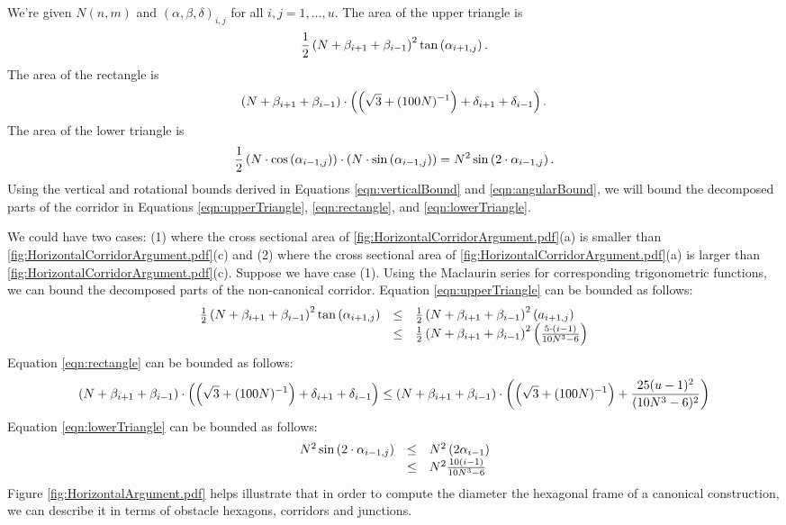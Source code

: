 We're given $N(n,m)$ and $(\alpha, \beta, \delta)_{i,j}$ for all $i,j = 1, \dots, u$. 
The area of the upper triangle is 
\begin{equation}\label{eqn:upperTriangle}
\frac{1}{2}\left( N+\beta_{i+1} + \beta_{i-1} \right)^2 \tan \left( \alpha_{i+1,j} \right).
\end{equation}
The area of the rectangle is 
\begin{equation}\label{eqn:rectangle}
\left( N + \beta_{i+1} + \beta_{i-1} \right) \cdot \left( \left( \sqrt{3} + (100N)^{-1} \right) + \delta_{i+1} + \delta_{i-1} \right).
\end{equation}
The area of the lower triangle is 
\begin{equation}\label{eqn:lowerTriangle}
\frac{1}{2} \left( N \cdot \cos \left(  \alpha_{i-1,j}  \right)  \right) \cdot \left( N \cdot \sin \left( \alpha_{i-1,j} \right)  \right)= N^2 \sin \left( 2 \cdot \alpha_{i-1,j} \right).
\end{equation}
Using the vertical and rotational bounds derived in Equations \ref{eqn:verticalBound} and \ref{eqn:angularBound},  we will bound the decomposed parts of the corridor in Equations \ref{eqn:upperTriangle}, \ref{eqn:rectangle}, and \ref{eqn:lowerTriangle}.

We could have two cases: (1) where the cross sectional area of \ref{fig:HorizontalCorridorArgument.pdf}(a) is smaller than \ref{fig:HorizontalCorridorArgument.pdf}(c) and (2) where the cross sectional area of \ref{fig:HorizontalCorridorArgument.pdf}(a) is larger than \ref{fig:HorizontalCorridorArgument.pdf}(c).
Suppose we have case (1). Using the Maclaurin series for corresponding trigonometric functions, we can bound the decomposed parts of the non-canonical corridor.
Equation \ref{eqn:upperTriangle} can be bounded as follows:
\begin{equation}\label{eqn:upperTriangleBound}
\begin{array}{rcl}
\frac{1}{2}\left( N+\beta_{i+1} + \beta_{i-1} \right)^2 \tan \left( \alpha_{i+1,j} \right) &\leq& \frac{1}{2}\left( N+\beta_{i+1} + \beta_{i-1} \right)^2 \left( a_{i+1,j} \right)\\
&\leq& \frac{1}{2}\left( N+\beta_{i+1} + \beta_{i-1} \right)^2 \left( \frac{5 \cdot (i-1)}{10N^3 - 6} \right)
\end{array}
\end{equation}
Equation \ref{eqn:rectangle} can be bounded as follows:
\begin{equation}\label{eqn:rectangleBound}
\left( N + \beta_{i+1} + \beta_{i-1} \right) \cdot \left( \left( \sqrt{3} + (100N)^{-1} \right) + \delta_{i+1} + \delta_{i-1} \right)\leq\left( N + \beta_{i+1} + \beta_{i-1} \right) \cdot \left( \left( \sqrt{3} + (100N)^{-1} \right) + \frac{25(u-1)^2}{(10N^3 - 6)^2} \right)
\end{equation}
Equation \ref{eqn:lowerTriangle} can be bounded as follows:
\begin{equation}\label{eqn:lowerTriangleBound}
\begin{array}{rcl}
N^2 \sin \left( 2 \cdot \alpha_{i-1,j} \right)&\leq&N^2 \left( 2 \alpha_{i-1} \right)\\
&\leq&N^2 \frac{10(i-1)}{10N^3 -6}
\end{array}
\end{equation}
Figure \ref{fig:HorizontalArgument.pdf} helps illustrate that in order to compute the diameter the hexagonal frame of a canonical construction, we can describe it in terms of obstacle hexagons, corridors and junctions.

